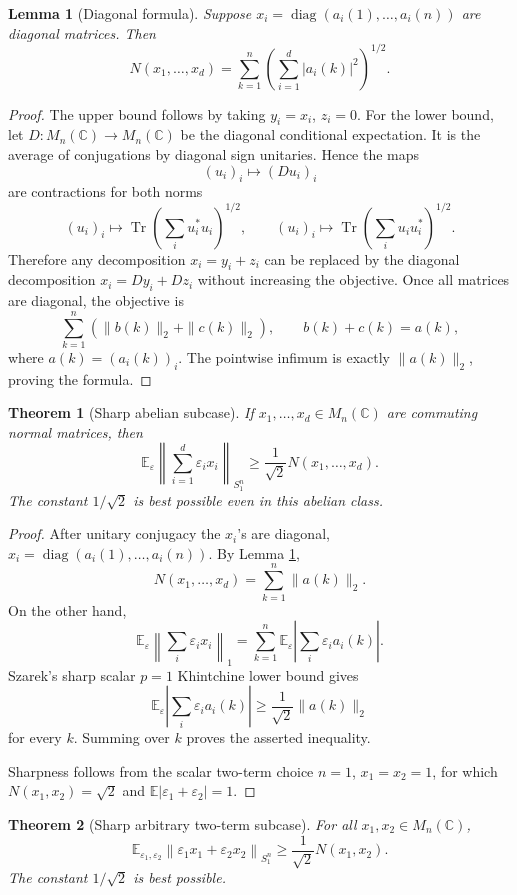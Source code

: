 \documentclass[11pt]{article}
\newtheorem{theorem}{Theorem}
\newtheorem{lemma}{Lemma}
\newcommand{\Tr}{\operatorname{Tr}}
\newcommand{\E}{\mathbb E}
\newcommand{\eps}{\varepsilon}
\newcommand{\C}{\mathbb C}
\newcommand{\diag}{\operatorname{diag}}
\begin{document}
\begin{lemma}[Diagonal formula]
\label{lem:diag}
Suppose \(x_i=\diag(a_i(1),\ldots,a_i(n))\) are diagonal matrices.  Then
\[
N(x_1,\ldots,x_d)
=
\sum_{k=1}^n\left(\sum_{i=1}^d |a_i(k)|^2\right)^{1/2}.
\]
\end{lemma}

\begin{proof}
The upper bound follows by taking \(y_i=x_i\), \(z_i=0\).  For the lower
bound, let \(D:M_n(\C)\to M_n(\C)\) be the diagonal conditional
expectation.  It is the average of conjugations by diagonal sign
unitaries.  Hence the maps
\[
(u_i)_i\mapsto (D u_i)_i
\]
are contractions for both norms
\[
(u_i)_i\mapsto \Tr\left(\sum_i u_i^*u_i\right)^{1/2},
\qquad
(u_i)_i\mapsto \Tr\left(\sum_i u_i u_i^*\right)^{1/2}.
\]
Therefore any decomposition \(x_i=y_i+z_i\) can be replaced by the
diagonal decomposition \(x_i=D y_i+D z_i\) without increasing the
objective.  Once all matrices are diagonal, the objective is
\[
\sum_{k=1}^n \left(\|b(k)\|_2+\|c(k)\|_2\right),
\qquad b(k)+c(k)=a(k),
\]
where \(a(k)=(a_i(k))_i\).  The pointwise infimum is exactly
\(\|a(k)\|_2\), proving the formula.
\end{proof}

\begin{theorem}[Sharp abelian subcase]
\label{thm:abelian}
If \(x_1,\ldots,x_d\in M_n(\C)\) are commuting normal matrices, then
\[
\E_\eps\left\|\sum_{i=1}^d \eps_i x_i\right\|_{S_1^n}
\geq
\frac1{\sqrt2}N(x_1,\ldots,x_d).
\]
The constant \(1/\sqrt2\) is best possible even in this abelian class.
\end{theorem}

\begin{proof}
After unitary conjugacy the \(x_i\)'s are diagonal,
\(x_i=\diag(a_i(1),\ldots,a_i(n))\).  By Lemma \ref{lem:diag},
\[
N(x_1,\ldots,x_d)=\sum_{k=1}^n \|a(k)\|_2.
\]
On the other hand,
\[
\E_\eps\left\|\sum_i \eps_i x_i\right\|_1
=
\sum_{k=1}^n \E_\eps\left|\sum_i \eps_i a_i(k)\right|.
\]
Szarek's sharp scalar \(p=1\) Khintchine lower bound gives
\[
\E_\eps\left|\sum_i \eps_i a_i(k)\right|
\geq \frac1{\sqrt2}\|a(k)\|_2
\]
for every \(k\).  Summing over \(k\) proves the asserted inequality.

Sharpness follows from the scalar two-term choice \(n=1\),
\(x_1=x_2=1\), for which \(N(x_1,x_2)=\sqrt2\) and
\(\E|\eps_1+\eps_2|=1\).
\end{proof}

\begin{theorem}[Sharp arbitrary two-term subcase]
\label{thm:twoterm}
For all \(x_1,x_2\in M_n(\C)\),
\[
\E_{\eps_1,\eps_2}\left\|\eps_1x_1+\eps_2x_2\right\|_{S_1^n}
\geq
\frac1{\sqrt2}N(x_1,x_2).
\]
The constant \(1/\sqrt2\) is best possible.
\end{theorem}
\end{document}
